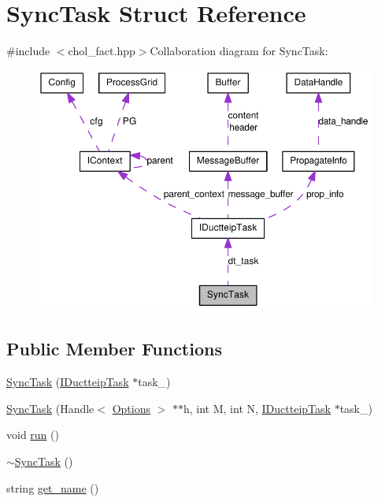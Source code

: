 \hypertarget{struct_sync_task}{
\section{SyncTask Struct Reference}
\label{struct_sync_task}
}


{\ttfamily \#include $<$chol\_\-fact.hpp$>$}Collaboration diagram for SyncTask:\nopagebreak
\begin{figure}[H]
\begin{center}
\leavevmode
\includegraphics[width=394pt]{struct_sync_task__coll__graph}
\end{center}
\end{figure}
\subsection*{Public Member Functions}
\begin{DoxyCompactItemize}
\item 
\hyperlink{struct_sync_task_a3ebb63e8654c8892c1ff2262e4ab345b}{SyncTask} (\hyperlink{class_i_ductteip_task}{IDuctteipTask} $\ast$task\_\-)
\item 
\hyperlink{struct_sync_task_a5bb3343352ebd177a3f8b71e048db67e}{SyncTask} (Handle$<$ \hyperlink{struct_options}{Options} $>$ $\ast$$\ast$h, int M, int N, \hyperlink{class_i_ductteip_task}{IDuctteipTask} $\ast$task\_\-)
\item 
void \hyperlink{struct_sync_task_a98f59db0f166b573d7822ca61462cfeb}{run} ()
\item 
\hyperlink{struct_sync_task_a2abccd8a59e9080dff8e8b9fc2d11107}{$\sim$SyncTask} ()
\item 
string \hyperlink{struct_sync_task_a12a683de3635d371b0a25a34df27b1a8}{get\_\-name} ()
\end{DoxyCompactItemize}
